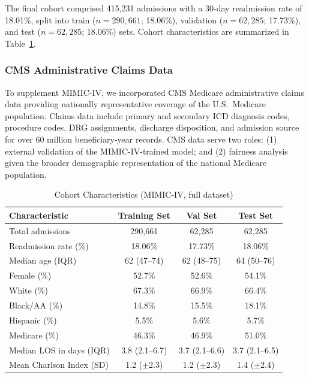 \documentclass[11pt,letterpaper]{article}
\begin{document}
The final cohort comprised 415,231 admissions with a 30-day readmission rate of 18.01\%, split into train ($n = 290{,}661$; 18.06\%), validation ($n = 62{,}285$; 17.73\%), and test ($n = 62{,}285$; 18.06\%) sets. Cohort characteristics are summarized in Table~\ref{tab:cohort}.

\subsubsection{CMS Administrative Claims Data}

To supplement MIMIC-IV, we incorporated CMS Medicare administrative claims data providing nationally representative coverage of the U.S.\ Medicare population. Claims data include primary and secondary ICD diagnosis codes, procedure codes, DRG assignments, discharge disposition, and admission source for over 60 million beneficiary-year records. CMS data serve two roles: (1) external validation of the MIMIC-IV-trained model; and (2) fairness analysis given the broader demographic representation of the national Medicare population.

\begin{table}[H]
\centering
\caption{Cohort Characteristics (MIMIC-IV, full dataset)}
\label{tab:cohort}
\begin{tabular}{lccc}
\toprule
\textbf{Characteristic} & \textbf{Training Set} & \textbf{Val Set} & \textbf{Test Set} \\
\midrule
Total admissions           & 290,661  & 62,285 & 62,285 \\
Readmission rate (\%)      & 18.06\%  & 17.73\% & 18.06\% \\
Median age (IQR)           & 62 (47--74)  & 62 (48--75) & 64 (50--76) \\
Female (\%)                & 52.7\%   & 52.6\%  & 54.1\% \\
White (\%)                 & 67.3\%   & 66.9\%  & 66.4\% \\
Black/AA (\%)              & 14.8\%   & 15.5\%  & 18.1\% \\
Hispanic (\%)              & 5.5\%    & 5.6\%   & 5.7\% \\
Medicare (\%)              & 46.3\%   & 46.9\%  & 51.0\% \\
Median LOS in days (IQR)   & 3.8 (2.1--6.7) & 3.7 (2.1--6.6) & 3.7 (2.1--6.5) \\
Mean Charlson Index (SD)   & 1.2 ($\pm$2.3) & 1.2 ($\pm$2.3) & 1.4 ($\pm$2.4) \\
\bottomrule
\end{tabular}
\end{table}
\end{document}
